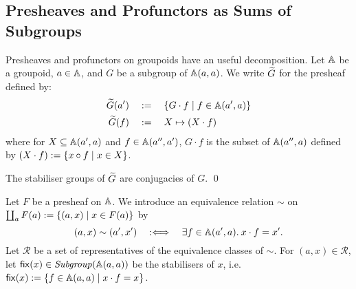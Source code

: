 \subsection{Presheaves and Profunctors as Sums of Subgroups}
Presheaves and profunctors on groupoids have an useful decomposition.
Let \( \mathbb{A} \) be a groupoid, \( a \in \mathbb{A} \), and \( G \) be a subgroup of \( \mathbb{A}(a,a) \).
We write \( \widetilde{G} \) for the presheaf defined by:
\begin{align*}
    \widetilde{G}(a')
    &\quad:=\quad
    \{ G \cdot f \mid f \in \mathbb{A}(a', a) \}
    \\
    \widetilde{G}(f)
    &\quad:=\quad
    X \mapsto (X \cdot f)
\end{align*}
where for \( X \subseteq \mathbb{A}(a', a) \) and \( f \in \mathbb{A}(a'', a') \), \( G \cdot f \) is the subset of \( \mathbb{A}(a'', a) \) defined by \( (X \cdot f) := \{ x \circ f \mid x \in X \} \).

\begin{proposition}
    The stabiliser groups of \( \widetilde{G} \) are conjugacies of \( G \).
    \qed
\end{proposition}

\newcommand{\Stabiliser}{\mathsf{fix}}

Let \( F \) be a presheaf on \( \mathbb{A} \).
We introduce an equivalence relation \( \sim \) on \( \coprod_a F(a) := \{ (a, x) \mid x \in F(a) \} \) by
\begin{equation*}
    (a, x) \sim (a', x')
    \quad:\Longleftrightarrow\quad
    \exists f \in \mathbb{A}(a', a).\: x \cdot f = x'.
\end{equation*}
Let \( \mathcal{R} \) be a set of representatives of the equivalence classes of \( \sim \).
For \( (a, x) \in \mathcal{R} \), let \( \Stabiliser(x) \in \Subgroup(\Grp(a,a)) \) be the stabilisers of \( x \), i.e.~\( \Stabiliser(x) \defeq \{ f \in \Grp(a,a) \mid x \cdot f = x \} \).

